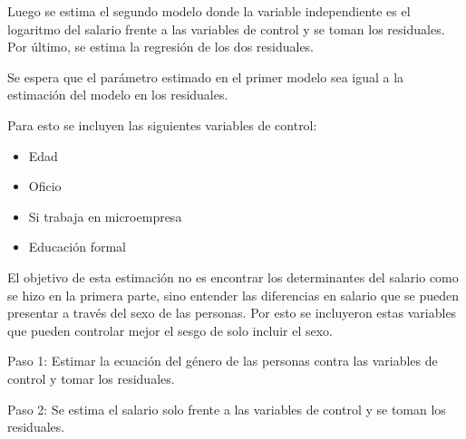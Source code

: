 \documentclass[
]{article}
\newenvironment{Shaded}{\begin{snugshade}}{\end{snugshade}}
\newcommand{\AttributeTok}[1]{\textcolor[rgb]{0.13,0.29,0.53}{#1}}
\newcommand{\FunctionTok}[1]{\textcolor[rgb]{0.13,0.29,0.53}{\textbf{#1}}}
\newcommand{\NormalTok}[1]{#1}
\newcommand{\OtherTok}[1]{\textcolor[rgb]{0.56,0.35,0.01}{#1}}
\newcommand{\SpecialCharTok}[1]{\textcolor[rgb]{0.81,0.36,0.00}{\textbf{#1}}}
\begin{document}
Luego se estima el segundo modelo donde la variable independiente es el
logaritmo del salario frente a las variables de control y se toman los
residuales. Por último, se estima la regresión de los dos residuales.

Se espera que el parámetro estimado en el primer modelo sea igual a la
estimación del modelo en los residuales.

Para esto se incluyen las siguientes variables de control:

\begin{itemize}
\item
  Edad
\item
  Oficio
\item
  Si trabaja en microempresa
\item
  Educación formal
\end{itemize}

El objetivo de esta estimación no es encontrar los determinantes del
salario como se hizo en la primera parte, sino entender las diferencias
en salario que se pueden presentar a través del sexo de las personas.
Por esto se incluyeron estas variables que pueden controlar mejor el
sesgo de solo incluir el sexo.

Paso 1: Estimar la ecuación del género de las personas contra las
variables de control y tomar los residuales.

\begin{Shaded}
\end{Shaded}

Paso 2: Se estima el salario solo frente a las variables de control y se
toman los residuales.

\begin{Shaded}
\end{Shaded}
\end{document}
